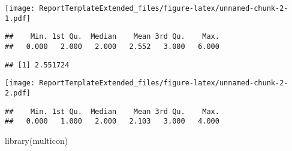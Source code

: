 \documentclass[
]{article}
\newenvironment{Shaded}{\begin{snugshade}}{\end{snugshade}}
\newcommand{\AttributeTok}[1]{\textcolor[rgb]{0.77,0.63,0.00}{#1}}
\newcommand{\CommentTok}[1]{\textcolor[rgb]{0.56,0.35,0.01}{\textit{#1}}}
\newcommand{\FunctionTok}[1]{\textcolor[rgb]{0.00,0.00,0.00}{#1}}
\newcommand{\NormalTok}[1]{#1}
\newcommand{\SpecialCharTok}[1]{\textcolor[rgb]{0.00,0.00,0.00}{#1}}
\newcommand{\StringTok}[1]{\textcolor[rgb]{0.31,0.60,0.02}{#1}}
\begin{document}
\texttt{[image: ReportTemplateExtended\_files/figure-latex/unnamed-chunk-2-1.pdf]}

\begin{Shaded}
\end{Shaded}

\begin{verbatim}
##    Min. 1st Qu.  Median    Mean 3rd Qu.    Max. 
##   0.000   2.000   2.000   2.552   3.000   6.000
\end{verbatim}

\begin{Shaded}
\end{Shaded}

\begin{verbatim}
## [1] 2.551724
\end{verbatim}

\begin{Shaded}
\end{Shaded}

\texttt{[image: ReportTemplateExtended\_files/figure-latex/unnamed-chunk-2-2.pdf]}

\begin{Shaded}
\end{Shaded}

\begin{verbatim}
##    Min. 1st Qu.  Median    Mean 3rd Qu.    Max. 
##   0.000   1.000   2.000   2.103   3.000   4.000
\end{verbatim}

\begin{Shaded}
\begin{Highlighting}[]
\FunctionTok{library}\NormalTok{(multicon)}
\end{Highlighting}
\end{Shaded}
\end{document}
